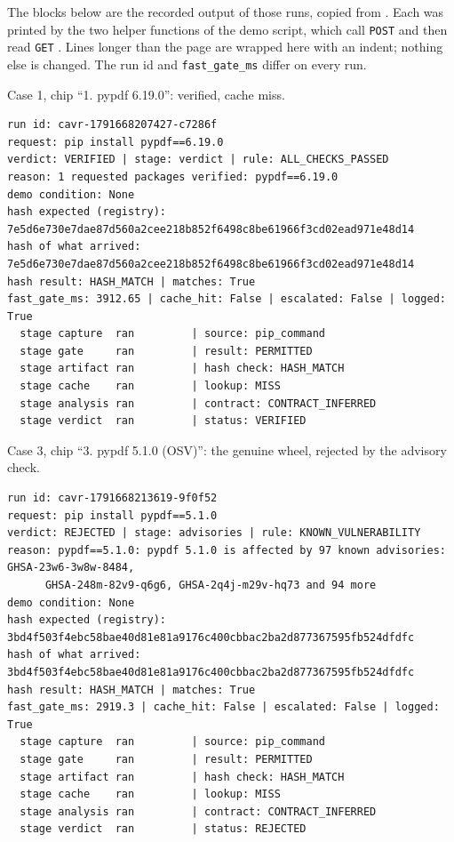 \begin{sloppypar}
The blocks below are the recorded output of those runs, copied from . Each was printed by the two helper functions of the demo script, which call \texttt{POST}  and then read \texttt{GET} . Lines longer than the page are wrapped here with an indent; nothing else is changed. The run id and \texttt{fast\_gate\_ms} differ on every run.
\end{sloppypar}

\noindent Case 1, chip ``1. pypdf 6.19.0'': verified, cache miss.
\begin{singlespace}
\scriptsize
\begin{verbatim}
run id: cavr-1791668207427-c7286f
request: pip install pypdf==6.19.0
verdict: VERIFIED | stage: verdict | rule: ALL_CHECKS_PASSED
reason: 1 requested packages verified: pypdf==6.19.0
demo condition: None
hash expected (registry): 7e5d6e730e7dae87d560a2cee218b852f6498c8be61966f3cd02ead971e48d14
hash of what arrived:     7e5d6e730e7dae87d560a2cee218b852f6498c8be61966f3cd02ead971e48d14
hash result: HASH_MATCH | matches: True
fast_gate_ms: 3912.65 | cache_hit: False | escalated: False | logged: True
  stage capture  ran         | source: pip_command
  stage gate     ran         | result: PERMITTED
  stage artifact ran         | hash check: HASH_MATCH
  stage cache    ran         | lookup: MISS
  stage analysis ran         | contract: CONTRACT_INFERRED
  stage verdict  ran         | status: VERIFIED
\end{verbatim}
\end{singlespace}

\noindent Case 3, chip ``3. pypdf 5.1.0 (OSV)'': the genuine wheel, rejected by the advisory check.
\begin{singlespace}
\scriptsize
\begin{verbatim}
run id: cavr-1791668213619-9f0f52
request: pip install pypdf==5.1.0
verdict: REJECTED | stage: advisories | rule: KNOWN_VULNERABILITY
reason: pypdf==5.1.0: pypdf 5.1.0 is affected by 97 known advisories: GHSA-23w6-3w8w-8484,
      GHSA-248m-82v9-q6g6, GHSA-2q4j-m29v-hq73 and 94 more
demo condition: None
hash expected (registry): 3bd4f503f4ebc58bae40d81e81a9176c400cbbac2ba2d877367595fb524dfdfc
hash of what arrived:     3bd4f503f4ebc58bae40d81e81a9176c400cbbac2ba2d877367595fb524dfdfc
hash result: HASH_MATCH | matches: True
fast_gate_ms: 2919.3 | cache_hit: False | escalated: False | logged: True
  stage capture  ran         | source: pip_command
  stage gate     ran         | result: PERMITTED
  stage artifact ran         | hash check: HASH_MATCH
  stage cache    ran         | lookup: MISS
  stage analysis ran         | contract: CONTRACT_INFERRED
  stage verdict  ran         | status: REJECTED
\end{verbatim}
\end{singlespace}


